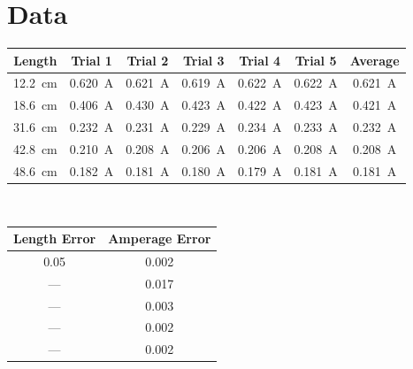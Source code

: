 \documentclass{article}
\numberwithin{equation}{subsection}
\begin{document}
    \section{Data}
        \begin{tabular}{|c|||c|c|c|c|c||c|}
            \hline
            \bfseries Length & \bfseries Trial 1 & \bfseries Trial 2 & \bfseries Trial 3 & \bfseries Trial 4 & \bfseries Trial 5 & \bfseries Average
            \\\hline
            \SI{12.2}{\cm} & \SI{0.620}{\A} & \SI{0.621}{\A} & \SI{0.619}{\A} & \SI{0.622}{\A} & \SI{0.622}{\A} & \SI{0.621}{\A}
            \\\hline
            \SI{18.6}{\cm} & \SI{0.406}{\A} & \SI{0.430}{\A} & \SI{0.423}{\A} & \SI{0.422}{\A} & \SI{0.423}{\A} & \SI{0.421}{\A}
            \\\hline
            \SI{31.6}{\cm} & \SI{0.232}{\A} & \SI{0.231}{\A} & \SI{0.229}{\A} & \SI{0.234}{\A} & \SI{0.233}{\A} & \SI{0.232}{\A}
            \\\hline
            \SI{42.8}{\cm} & \SI{0.210}{\A} & \SI{0.208}{\A} & \SI{0.206}{\A} & \SI{0.206}{\A} & \SI{0.208}{\A} & \SI{0.208}{\A}
            \\\hline
            \SI{48.6}{\cm} & \SI{0.182}{\A} & \SI{0.181}{\A} & \SI{0.180}{\A} & \SI{0.179}{\A} & \SI{0.181}{\A} & \SI{0.181}{\A}
            \\\hline
        \end{tabular}
        \\
        \begin{tabular}{|c|c|}
            \hline
            \bfseries Length Error & \bfseries Amperage Error
            \\\hline
            0.05 & 0.002
            \\\hline
            --- & 0.017
            \\\hline
            --- & 0.003
            \\\hline
            --- & 0.002
            \\\hline
            --- & 0.002
            \\\hline
        \end{tabular}
        \\
\end{document}
